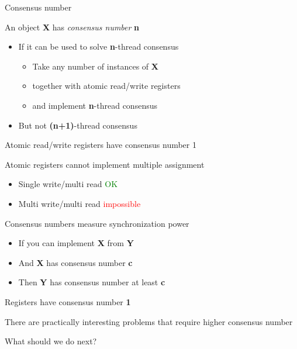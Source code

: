 \begin{frame}{Consensus number}

An object \textbf{X} has \textit{consensus number} \textbf{n}
\begin{itemize}
  \item If it can be used to solve \textbf{n}-thread consensus
  \begin{itemize}
    \item Take any number of instances of \textbf{X} 
    \item together with atomic read/write registers
    \item and implement \textbf{n}-thread consensus
  \end{itemize}
  \item But not \textbf{(n+1)}-thread consensus
\end{itemize}

\pause

\begin{theorem}
  Atomic read/write registers have consensus number 1
\end{theorem}

Atomic registers cannot implement multiple assignment
\begin{itemize}
  \item Single write/multi read \textcolor{green}{OK}
  \item Multi write/multi read \textcolor{red}{impossible}
\end{itemize}

\end{frame}

\begin{frame}[t]{Consensus numbers measure synchronization power}

\begin{theorem}
\begin{itemize}
  \item If you can implement \textbf{X} from \textbf{Y}
  \item And \textbf{X} has consensus number \textbf{c}
  \item Then \textbf{Y} has consensus number at least \textbf{c}
\end{itemize}
\end{theorem}

\pause

Registers have consensus number \textbf{1}

\pause

There are practically interesting problems that require higher consensus number

\pause

What should we do next?

\end{frame}

